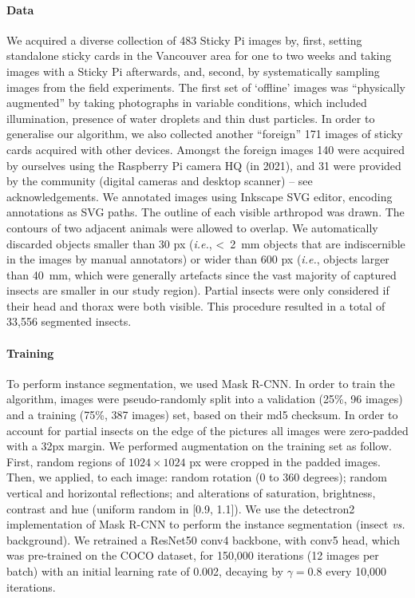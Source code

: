 \documentclass[12pt]{article}
\begin{document}
\begin{linenumbers}
		\paragraph{Data}
		We acquired a diverse collection of 483 Sticky Pi images by, first, setting standalone sticky cards in the Vancouver area for one to two weeks and taking images with a Sticky Pi afterwards, and, second, by systematically sampling images from the field experiments. The first set of ‘offline’ images was “physically augmented” by taking photographs in variable conditions, which included illumination, presence of water droplets and thin dust particles. 
		In order to generalise our algorithm, we also collected another ``foreign'' 171 images of sticky cards acquired with other devices. Amongst the foreign images 140 were acquired by ourselves using the Raspberry Pi camera HQ (in 2021), and 31 were provided by the community (digital cameras and desktop scanner) -- see acknowledgements. 
		We annotated images using Inkscape SVG editor, encoding annotations as SVG paths. The outline of each visible arthropod was drawn. The contours of two adjacent animals were allowed to overlap. We automatically discarded objects smaller than 30 px (\emph{i.e.}, <~2~mm objects that are indiscernible in the images by manual annotators) or wider than 600 px (\emph{i.e.}, objects larger than 40~mm, which were generally artefacts since the vast majority of captured insects are smaller in our study region). Partial insects were only considered if their head and thorax were both visible. This procedure resulted in a total of 
		33,556
		segmented insects.
		
		\paragraph{Training}
		To perform instance segmentation, we used Mask R-CNN\cite{he_mask_2017}. In order to train the algorithm, images were pseudo-randomly split into a validation (25\%, 96 images) and a training (75\%, 387 images) set, based on their md5 checksum.
		In order to account for partial insects on the edge of the pictures all images were zero-padded with a 32px margin.
		We performed augmentation on the training set as follow. 
		First, random regions of $1024 \times{} 1024$ px were cropped in the padded images.
		Then, we applied, to each image: random rotation (0 to 360 degrees); random vertical and horizontal reflections; and alterations of saturation, brightness, contrast and hue (uniform random in [0.9, 1.1]). 
		We use the detectron2 implementation \cite{wu_detectron2_2019} of Mask R-CNN to perform the instance segmentation (insect \emph{vs.} background). We retrained a ResNet50 conv4 backbone, with conv5 head, which was pre-trained on the COCO dataset, 
		for 150,000 iterations 
		(12 images per batch) with an initial learning rate of 0.002, decaying by $\gamma=0.8$ every 10,000 iterations.
		

\end{linenumbers}
\end{document}
